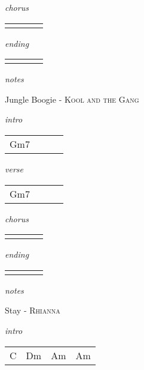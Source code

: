 \documentclass[12pt]{article}
\begin{document}
\textit{chorus}

\begin{tabular}{|P{1.25in}|P{1.25in}|P{1.25in}|P{1.25in}|}
    &   &   &   \\
\end{tabular}

\textit{ending}

\begin{tabular}{|P{1.25in}|P{1.25in}|P{1.25in}|P{1.25in}|}
    &   &   &   \\
\end{tabular}

\textit{notes}

\newpage


{\Huge Jungle Boogie} {\huge - \textsc{Kool and the Gang}}

\huge
\textit{intro}

\begin{tabular}{|P{1.25in}|P{1.25in}|P{1.25in}|P{1.25in}|}
  Gm7 &   &   &   \\
\end{tabular}

\textit{verse}

\begin{tabular}{|P{1.25in}|P{1.25in}|P{1.25in}|P{1.25in}|}
  Gm7 &   &   &   \\
\end{tabular}

\textit{chorus}

\begin{tabular}{|P{1.25in}|P{1.25in}|P{1.25in}|P{1.25in}|}
    &   &   &   \\
\end{tabular}

\textit{ending}

\begin{tabular}{|P{1.25in}|P{1.25in}|P{1.25in}|P{1.25in}|}
    &   &   &   \\
\end{tabular}

\textit{notes}

\newpage

{\Huge Stay} {\huge - \textsc{Rhianna}}

\huge
\textit{intro}

\begin{tabular}{|P{1.25in}|P{1.25in}|P{1.25in}|P{1.25in}|}
  C & Dm  & Am  & Am  \\
\end{tabular}
\end{document}
